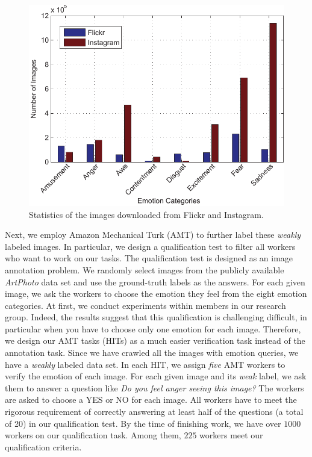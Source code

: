 \documentclass[letterpaper]{article}
\begin{document}
\begin{figure}
\begin{center}
\includegraphics[width=.4\textwidth]{./dist_bar-crop}
\end{center}
\caption{Statistics of the images downloaded from Flickr and Instagram.}
\label{fig:stat}
\end{figure}

Next, we employ Amazon Mechanical Turk (AMT) to further label these \textit{weakly} labeled images. In particular, we design a qualification test to filter all workers who want to work on our tasks. The qualification test is designed as an image annotation problem. We randomly select images from the publicly available \textit{ArtPhoto} data set and use the ground-truth labels as the answers. For each given image, we ask the workers to choose the emotion they feel from the eight emotion categories. At first, we conduct experiments within members in our research group. Indeed, the results suggest that this qualification is challenging difficult, in particular when you have to choose only one emotion for each image. Therefore, we design our AMT tasks (HITs) as a much easier verification task instead of the annotation task. Since we have crawled all the images with emotion queries, we have a \textit{weakly} labeled data set. In each HIT, we assign \textit{five} AMT workers to verify the emotion of each image. For each given image and its \textit{weak} label, we ask them to answer a question like \textit{ Do you feel anger seeing this image?} The workers are asked to choose a YES or NO for each image. All workers have to meet the rigorous requirement of correctly answering at least half of the questions (a total of 20) in our qualification test. By the time of finishing work, we have over $1000$ workers on our qualification task. Among them, $225$ workers meet our qualification criteria.
\end{document}
